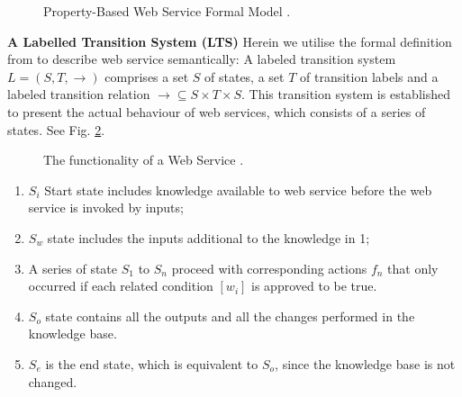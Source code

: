 \begin{figure}
\centerline{
}
\caption{Property-Based Web Service Formal Model \cite{agarwal2010d5}.}
\label{fig:ws}
\end{figure}


\textbf{A Labelled Transition System (LTS)} Herein we utilise the formal definition from \cite{agarwal2010d5} to describe web service semantically: A labeled transition system $L = (S,T,\rightarrow)$ comprises a set $S$ of states, a set $T$ of transition labels and a labeled transition relation $\rightarrow \subseteq S \times T \times S$. This transition system is established to present the actual behaviour of web services, which consists of a series of states. See Fig. \ref{fig:lts}.

\begin{figure}
\centerline{
}
\caption{ The functionality of a Web Service \cite{agarwal2010d5}.}
\label{fig:lts}
\end{figure}


\begin{enumerate}

\item $S_i$ Start state includes knowledge available to web service before the web service is invoked by inputs; 
\item $S_w$ state includes the inputs additional to the knowledge in 1; 
\item A series of state $S_1$ to $S_n$ proceed with corresponding actions $f_n$ that only occurred if each related condition $[w_i]$ is approved to be true. 
\item $S_o$ state contains all the outputs and all the changes performed in the knowledge base. 
\item $S_e$ is the end state, which is equivalent to $S_o$, since the knowledge base is not changed.
\end{enumerate}

